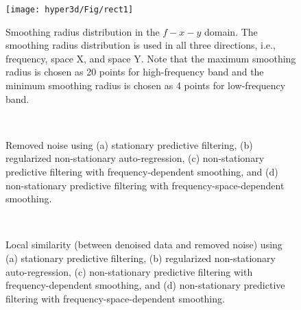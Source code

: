 \begin{figure}[htb!]
\centering
\texttt{[image: hyper3d/Fig/rect1]}
\caption{Smoothing radius distribution in the $f-x-y$ domain. The smoothing radius distribution is used in all three directions, i.e., frequency, space X, and space Y. Note that the maximum smoothing radius is chosen as 20 points for high-frequency band and the minimum smoothing radius is chosen as 4 points for low-frequency band. }
\label{fig:rect1}
\end{figure}

\begin{figure}[htb!]
\centering
{}
\\
\caption{Removed noise using (a) stationary predictive filtering, (b) regularized non-stationary auto-regression, (c) non-stationary predictive filtering with frequency-dependent smoothing, and (d) non-stationary predictive filtering with frequency-space-dependent smoothing.}
\label{fig:test2dif-0,test1dif-0,test0dif-0,test00dif-0}
\end{figure}


\begin{figure}[htb!]
\centering
{}
\\
\caption{Local similarity (between denoised data and removed noise) using (a) stationary predictive filtering, (b) regularized non-stationary auto-regression, (c) non-stationary predictive filtering with frequency-dependent smoothing, and (d) non-stationary predictive filtering with frequency-space-dependent smoothing.}
\label{fig:simi2,simi1,simi0,simi00}
\end{figure}


